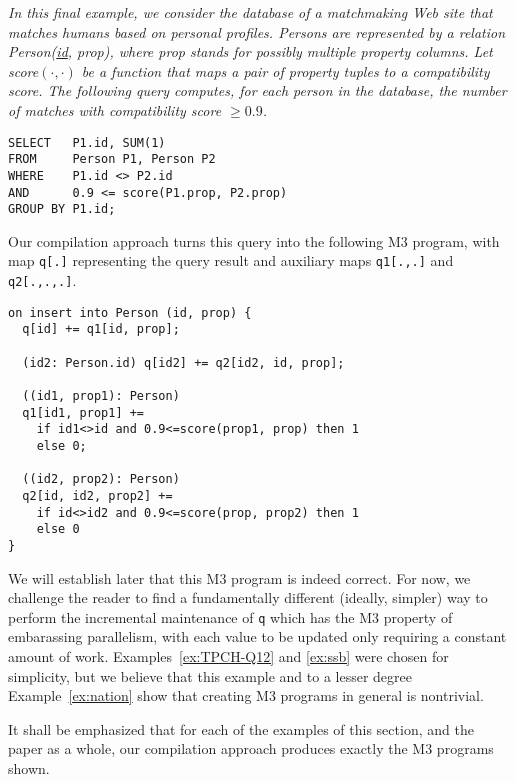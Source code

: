 \begin{example}\em
\label{ex:selfjoin}
In this final example, we consider the data\-base of a matchmaking Web site
that matches humans based on personal profiles. Persons are
represented by a relation Person(\underline{id}, prop), where
prop stands for possibly multiple property col\-umns. Let score$(\cdot, \cdot)$
be a function that maps a pair of property tuples to a compatibility score.
The following query computes, for each person in the database, the number of
matches with compatibility score $\ge 0.9$.
\begin{verbatim}
SELECT   P1.id, SUM(1)
FROM     Person P1, Person P2
WHERE    P1.id <> P2.id
AND      0.9 <= score(P1.prop, P2.prop)
GROUP BY P1.id;
\end{verbatim}

Our compilation approach turns this query into the following M3 program,
with map {\tt q[.]} representing the query result and auxiliary
maps {\tt q1[.,.]} and {\tt q2[.,.,.]}.
\begin{verbatim}
on insert into Person (id, prop) {
  q[id] += q1[id, prop];

  (id2: Person.id) q[id2] += q2[id2, id, prop];

  ((id1, prop1): Person)
  q1[id1, prop1] +=
    if id1<>id and 0.9<=score(prop1, prop) then 1
    else 0;

  ((id2, prop2): Person)
  q2[id, id2, prop2] +=
    if id<>id2 and 0.9<=score(prop, prop2) then 1
    else 0
}
\end{verbatim}
We will establish later that this M3 program is indeed correct.
For now, we challenge the reader to find a 
fundamentally different (ideally, simpler) way to
perform the incremental maintenance of {\tt q}
which has the M3 property of embarassing parallelism, with each value
to be updated only requiring a constant amount of work.
Examples~\ref{ex:TPCH-Q12} and \ref{ex:ssb} were chosen for simplicity,
but we believe that this example and to a lesser degree
Example~\ref{ex:nation} show that creating M3 programs in general
is nontrivial.
\punto
\end{example}


It shall be emphasized that for each of the examples of this section,
and the paper as a whole, our compilation approach produces exactly
the M3 programs shown.


